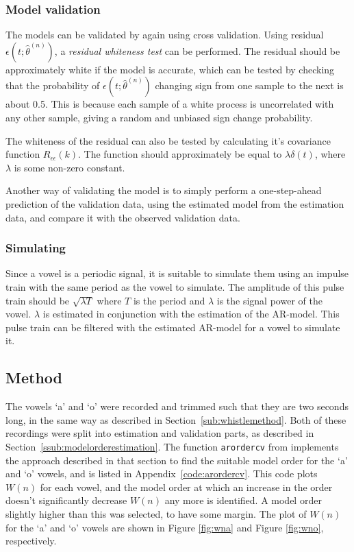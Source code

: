 \documentclass{IEEEtran}
\newcommand{\code}[1]{\texttt{#1}}
\begin{document}
\subsubsection{Model validation}
\label{ssub:modelvalidation}
The models can be validated by again using cross validation. Using residual
$\epsilon(t;\hat{\theta}^{(n)})$, a \textit{residual whiteness test} can be
performed. The residual should be approximately white if the model is accurate,
which can be tested by checking that the probability of
$\epsilon(t;\hat{\theta}^{(n)})$ changing sign from one sample to the next is
about 0.5. This is because each sample of a white process is uncorrelated with
any other sample, giving a random and unbiased sign change probability.

The whiteness of the residual can also be tested by calculating it's covariance
function $R_{\epsilon\epsilon}(k)$. The function should approximately be equal
to $\lambda\delta(t)$, where $\lambda$ is some non-zero constant.

Another way of validating the model is to simply perform a one-step-ahead
prediction of the validation data, using the estimated model from the
estimation data, and compare it with the observed validation data.

\subsubsection{Simulating}
Since a vowel is a periodic signal, it is suitable to simulate them using an
impulse train with the same period as the vowel to simulate. The amplitude
of this pulse train should be $\sqrt{\lambda T}$ where $T$ is the period and
$\lambda$ is the signal power of the vowel. $\lambda$ is estimated in conjunction with the
estimation of the AR-model.
This pulse train can be filtered with the estimated AR-model for a vowel
to simulate it.

\subsection{Method}
The vowels `a' and `o' were recorded and trimmed such that they are two seconds
long, in the same way as described in Section~\ref{sub:whistlemethod}.
Both of these recordings were split into estimation and validation parts,
as described in Section~\ref{ssub:modelorderestimation}. The function
\code{arordercv} from \cite{signalproc} implements the approach described in
that section to find the suitable model order for the `a' and `o' vowels, and is
listed in Appendix~\ref{code:arordercv}. This code plots $W(n)$ for each
vowel, and the model order at which an increase in the order doesn't
significantly decrease $W(n)$ any more is identified. A model order slightly
higher than this was selected, to have some margin. The plot of $W(n)$ for the
`a' and `o' vowels are shown in Figure \ref{fig:wna} and Figure \ref{fig:wno},
respectively.
\end{document}
